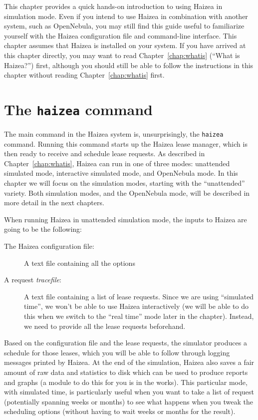 This chapter provides a quick hands-on introduction to using Haizea in simulation mode. Even if you intend to use Haizea in combination with another system, such as OpenNebula, you may still find this guide useful to familiarize yourself with the Haizea configuration file and command-line interface. This chapter assumes that Haizea is installed on your system. If you have arrived at this chapter directly, you may want to read Chapter~\ref{chap:whatis} (``What is Haizea?'') first, although you should still be able to follow the instructions in this chapter without reading Chapter~\ref{chap:whatis} first.

\section{The \texttt{haizea} command}

The main command in the Haizea system is, unsurprisingly, the \texttt{haizea} command. Running this command starts up the Haizea lease manager, which is then ready to receive and schedule lease requests. As described in Chapter~\ref{chap:whatis}, Haizea can run in one of three modes: unattended simulated mode, interactive simulated mode, and OpenNebula mode. In this chapter we will focus on the simulation modes, starting with the ``unattended'' variety. Both simulation modes, and the OpenNebula mode, will be described in more detail in the next chapters.

When running Haizea in unattended simulation mode, the inputs to Haizea are going to be the following:

\begin{description}
 \item [The Haizea configuration file:] A text file containing all the options
 \item [A request \emph{tracefile}:] A text file containing a list of lease requests. Since we are using ``simulated time'', we won't be able to use Haizea interactively (we will be able to do this when we switch to the ``real time'' mode later in the chapter). Instead, we need to provide all the lease requests beforehand.
\end{description}

Based on the configuration file and the lease requests, the simulator produces a schedule for those leases, which you will be able to follow through logging messages printed by Haizea. At the end of the simulation, Haizea also saves a fair amount of raw data and statistics to disk which can be used to produce reports and graphs (a module to do this for you is in the works). This particular mode, with simulated time, is particularly useful when you want to take a list of request (potentially spanning weeks or months) to see what happens when you tweak the scheduling options (without having to wait weeks or months for the result).

